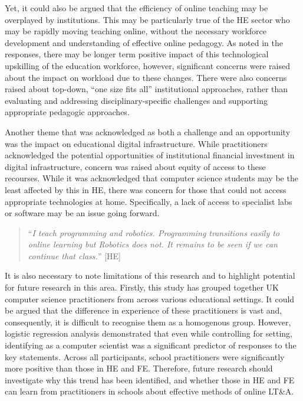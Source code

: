 \documentclass[sigconf]{acmart}
\begin{document}
Yet, it could also be argued that the efficiency of online teaching
may be overplayed by institutions. This may be particularly true of
the HE sector who may be rapidly moving teaching online, without the
necessary workforce development and understanding of effective online
pedagogy. As noted in the responses, there may be longer term positive
impact of this technological upskilling of the education workforce,
however, significant concerns were raised about the impact on workload
due to these changes. There were also concerns raised about top-down,
``one size fits all'' institutional approaches, rather than evaluating
and addressing disciplinary-specific challenges and supporting
appropriate pedagogic approaches.

Another theme that was acknowledged as both a challenge and an
opportunity was the impact on educational digital
infrastructure. While practitioners acknowledged the potential
opportunities of institutional financial investment in digital
infrastructure, concern was raised about equity of access to these
recourses. While it was acknowledged that computer science students
may be the least affected by this in HE, there was concern for those
that could not access appropriate technologies at home. Specifically,
a lack of access to specialist labs or software may be an issue going
forward.

\begin{quotation}
``{\emph{I teach programming and robotics.  Programming transitions
easily to online learning but Robotics does not.  It remains to be
seen if we can continue that class.}}'' [HE]
\end{quotation}

It is also necessary to note limitations of this research and to
highlight potential for future research in this area. Firstly, this
study has grouped together UK computer science practitioners from
across various educational settings. It could be argued that the
difference in experience of these practitioners is vast and,
consequently, it is difficult to recognise them as a homogenous
group. However, logistic regression analysis demonstrated that even
while controlling for setting, identifying as a computer scientist was
a significant predictor of responses to the key statements. Across all
participants, school practitioners were significantly more positive
than those in HE and FE. Therefore, future research should investigate
why this trend has been identified, and whether those in HE and FE can
learn from practitioners in schools about effective methods of online
LT\&A.
\end{document}
